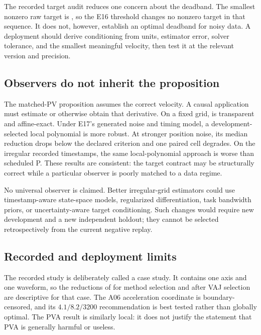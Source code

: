 The recorded target audit reduces one concern about the deadband. The smallest nonzero raw target is \RecordedMinimumNonzeroTarget, so the E16 threshold changes no nonzero target in that sequence. It does not, however, establish an optimal deadband for noisy data. A deployment should derive conditioning from units, estimator error, solver tolerance, and the smallest meaningful velocity, then test it at the relevant version and precision.

\subsection{Observers do not inherit the proposition}

The matched-PV proposition assumes the correct velocity. A causal application must estimate or otherwise obtain that derivative. On a fixed grid, \FutureOOne{} is transparent and affine-exact. Under E17's generated noise and timing model, a development-selected local polynomial is more robust. At stronger position noise, its median reduction drops below the declared criterion and one paired cell degrades. On the irregular recorded timestamps, the same local-polynomial approach is worse than scheduled P. These results are consistent: the target contract may be structurally correct while a particular observer is poorly matched to a data regime.

No universal observer is claimed. Better irregular-grid estimators could use timestamp-aware state-space models, regularized differentiation, task bandwidth priors, or uncertainty-aware target conditioning. Such changes would require new development and a new independent holdout; they cannot be selected retrospectively from the current negative replay.

\subsection{Recorded and deployment limits}

The recorded study is deliberately called a case study. It contains one axis and one waveform, so the reductions of \RecordedPVReductionPercent{} for method selection and \RecordedBestReductionPercent{} after VAJ selection are descriptive for that case. The A06 acceleration coordinate is boundary-censored, and its $4.1/8.2/3200$ recommendation is best tested rather than globally optimal. The PVA result is similarly local: it does not justify the statement that PVA is generally harmful or useless.

